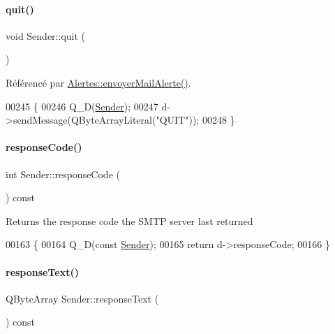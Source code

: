 \paragraph{\texorpdfstring{quit()}{quit()}}
{\footnotesize\ttfamily void Sender\+::quit (\begin{DoxyParamCaption}{ }\end{DoxyParamCaption})}



Référencé par \hyperlink{class_alertes_a375783502a78109f3323dc1ed90cfdc9}{Alertes\+::envoyer\+Mail\+Alerte()}.


\begin{DoxyCode}
00245 \{
00246     Q\_D(\hyperlink{class_simple_mail_1_1_sender}{Sender});
00247     d->sendMessage(QByteArrayLiteral(\textcolor{stringliteral}{"QUIT"}));
00248 \}
\end{DoxyCode}
\mbox{\label{class_simple_mail_1_1_sender_a5b5d8322553aa84e0166e3fecd43e4be}} 
\paragraph{\texorpdfstring{response\+Code()}{responseCode()}}
{\footnotesize\ttfamily int Sender\+::response\+Code (\begin{DoxyParamCaption}{ }\end{DoxyParamCaption}) const}

Returns the response code the S\+M\+TP server last returned 
\begin{DoxyCode}
00163 \{
00164     Q\_D(\textcolor{keyword}{const} \hyperlink{class_simple_mail_1_1_sender}{Sender});
00165     \textcolor{keywordflow}{return} d->responseCode;
00166 \}
\end{DoxyCode}
\mbox{\label{class_simple_mail_1_1_sender_aefd7b3516fa828a73070fb73d1101d9d}} 
\paragraph{\texorpdfstring{response\+Text()}{responseText()}}
{\footnotesize\ttfamily Q\+Byte\+Array Sender\+::response\+Text (\begin{DoxyParamCaption}{ }\end{DoxyParamCaption}) const}

